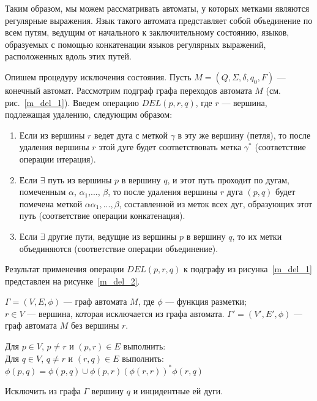 Таким образом, мы можем рассматривать автоматы, у которых метками являются регулярные выражения. Язык такого автомата представляет собой объединение по всем путям, ведущим от начального к заключительному состоянию, языков, образуемых с помощью конкатенации языков регулярных выражений, расположенных вдоль этих путей.

Опишем процедуру исключения состояния.
Пусть $M = (Q, \Sigma, \delta, q_0, F)$ --- конечный автомат. Рассмотрим подграф графа переходов автомата $M$ (см. рис.~\ref{m_del_1}). Введем операцию $DEL(p, r, q)$, где $r$ --- вершина, подлежащая удалению, следующим образом:
\begin{enumerate}
	\item Если из вершины $r$ ведет дуга с меткой $\gamma$ в эту же вершину (петля), то после удаления вершины $r$ этой дуге будет соответствовать метка $\gamma^*$ (соответствие операции итерация).
	\item Если $\exists$ путь из вершины $p$ в вершину $q$, и этот путь проходит по дугам, помеченным $\alpha$, $\alpha_1$,..., $\beta$, то после удаления вершины $r$ дуга $(p, q)$ будет помечена меткой $\alpha\alpha_1,...,\beta$, составленной из меток всех дуг, образующих этот путь (соответствие операции конкатенация).
	\item Если $\exists$ другие пути, ведущие из вершины $p$ в вершину $q$, то их метки объединяются (соответствие операции объединение).
\end{enumerate}
Результат применения операции $DEL(p, r, q)$ к подграфу из рисунка~\ref{m_del_1} представлен на рисунке~\ref{m_del_2}.


{
	$\Gamma = (V, E, \phi)$ --- граф автомата $M$, где $\phi$ --- функция разметки; \\
	$r \in V$ --- вершина, которая исключается из графа автомата.
}
{$\Gamma' = (V', E', \phi)$ --- граф автомата $M$ без вершины $r$.}
{ }
{
\item Для $p \in V$, $p \neq r$ и $(p, r) \in E$ выполнить: \\
			Для $q \in V$, $q \neq r$ и $(r, q) \in E$ выполнить: \\
			$\phi(p, q) = \phi(p, q) \cup \phi(p, r)(\phi(r, r))^*\phi(r, q)$
\item  Исключить из графа $\Gamma$ вершину $q$ и инцидентные ей дуги.
}

